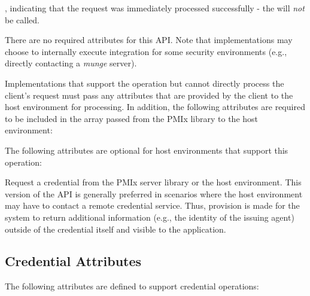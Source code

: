 \returnsimplenb

\returnstart
\begin{constantdesc}
\item {}, indicating that the request was immediately processed successfully - the  will \textit{not} be called.
\end{constantdesc}
\returnend

\reqattrstart
There are no required attributes for this \ac{API}. Note that implementations may choose to internally
execute integration for some security environments (e.g., directly
contacting a \textit{munge} server).

Implementations that support the operation but cannot directly process the client's request must pass any attributes that are provided by the client to the host environment for processing. In addition, the following attributes are required to be included in the  array passed from the \ac{PMIx} library to the host environment:


\reqattrend

\optattrstart
The following attributes are optional for host environments that support this operation:


\optattrend

\descr

Request a credential from the \ac{PMIx} server library or the host environment.  This version of the \ac{API} is generally preferred in scenarios where the host environment may have to contact a remote credential service. Thus, provision is made for the system to return additional information (e.g., the identity of the issuing agent) outside of the credential itself and visible to the application.

\subsection{Credential Attributes}
\label{chap:api_security:attributes}

The following attributes are defined to support credential operations:

%
%


